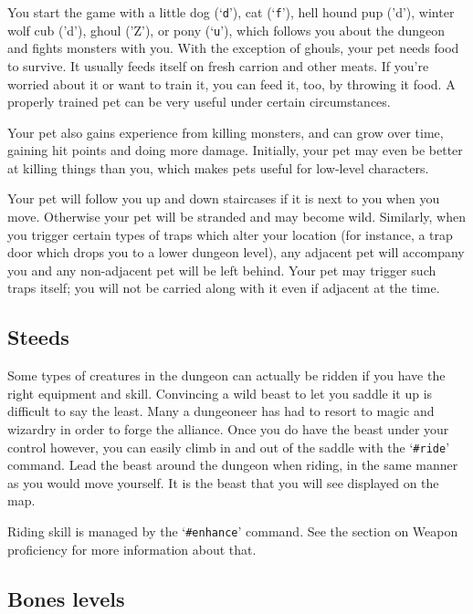 
You start the game with a little dog (`{\tt d}'), cat (`{\tt f}'), hell hound pup ('d'),
winter wolf cub ('d'), ghoul ('Z'), or pony (`{\tt u}'), which follows you about
the dungeon and fights monsters with you.  With the exception of ghouls, your
pet needs food to survive.  It usually feeds itself on fresh carrion
and other meats.  If you're worried about it or want to train it, you
can feed it, too, by throwing it food.  A properly trained pet can be
very useful under certain circumstances.

Your pet also gains experience from killing monsters, and can grow
over time, gaining hit points and doing more damage.  Initially, your
pet may even be better at killing things than you, which makes pets
useful for low-level characters.

Your pet will follow you up and down staircases if it is next to you
when you move.  Otherwise your pet will be stranded and may become
wild.  Similarly, when you trigger certain types of traps which alter
your location (for instance, a trap door which drops you to a lower
dungeon level), any adjacent pet will accompany you and any non-adjacent
pet will be left behind.  Your pet may trigger such traps itself; you
will not be carried along with it even if adjacent at the time.
\subsection*{Steeds}


Some types of creatures in the dungeon can actually be ridden if you
have the right equipment and skill.  Convincing a wild beast to let
you saddle it up is difficult to say the least.  Many a dungeoneer 
has had to resort to magic and wizardry in order to forge the alliance.
Once you do have the beast under your control however, you can 
easily climb in and out of the saddle with the `{\tt \#ride}' command.  Lead
the beast around the dungeon when riding, in the same manner as 
you would move yourself.  It is the beast that you will see displayed
on the map.

Riding skill is managed by the `{\tt \#enhance}' command.  See the section
on Weapon proficiency for more information about that.
\subsection*{Bones levels}

